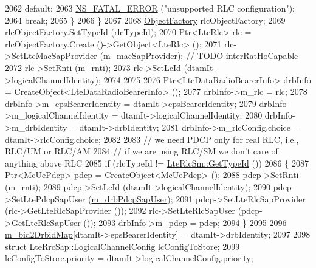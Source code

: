 \begin{DoxyCode}
2062                 \textcolor{keywordflow}{default}:
2063                   \hyperlink{group__fatal_ga5131d5e3f75d7d4cbfd706ac456fdc85}{NS\_FATAL\_ERROR} (\textcolor{stringliteral}{"unsupported RLC configuration"});
2064                   \textcolor{keywordflow}{break};                
2065                 \}
2066             \}
2067 
2068           \hyperlink{classns3_1_1Object_a2810e70b8c8377aa8617138fc0f65e92}{ObjectFactory} rlcObjectFactory;
2069           rlcObjectFactory.SetTypeId (rlcTypeId);
2070           Ptr<LteRlc> rlc = rlcObjectFactory.Create ()->GetObject<LteRlc> ();
2071           rlc->SetLteMacSapProvider (\hyperlink{classns3_1_1LteUeRrc_a194a22ce682adab02b0e9d2fc71fda48}{m\_macSapProvider}); \textcolor{comment}{// TODO interRatHoCapable }
2072           rlc->SetRnti (\hyperlink{classns3_1_1LteUeRrc_a8e078d8ef0ad23e670fe2ef08caab84f}{m\_rnti});
2073           rlc->SetLcId (dtamIt->logicalChannelIdentity);
2074 
2075 
2076           Ptr<LteDataRadioBearerInfo> drbInfo = CreateObject<LteDataRadioBearerInfo> ();
2077           drbInfo->m\_rlc = rlc;
2078           drbInfo->m\_epsBearerIdentity = dtamIt->epsBearerIdentity;
2079           drbInfo->m\_logicalChannelIdentity = dtamIt->logicalChannelIdentity;
2080           drbInfo->m\_drbIdentity = dtamIt->drbIdentity;
2081           drbInfo->m\_rlcConfig.choice = dtamIt->rlcConfig.choice;
2082  
2083           \textcolor{comment}{// we need PDCP only for real RLC, i.e., RLC/UM or RLC/AM}
2084           \textcolor{comment}{// if we are using RLC/SM we don't care of anything above RLC}
2085           \textcolor{keywordflow}{if} (rlcTypeId != \hyperlink{classns3_1_1LteRlcSm_a160bd39ce4e0d113dd5d93cc3a258045}{LteRlcSm::GetTypeId} ())
2086             \{
2087               Ptr<McUePdcp> pdcp = CreateObject<McUePdcp> (); 
2088               pdcp->SetRnti (\hyperlink{classns3_1_1LteUeRrc_a8e078d8ef0ad23e670fe2ef08caab84f}{m\_rnti});
2089               pdcp->SetLcId (dtamIt->logicalChannelIdentity);
2090               pdcp->SetLtePdcpSapUser (\hyperlink{classns3_1_1LteUeRrc_a6f2505a766e5a391d82170ebff83a9c2}{m\_drbPdcpSapUser});
2091               pdcp->SetLteRlcSapProvider (rlc->GetLteRlcSapProvider ());
2092               rlc->SetLteRlcSapUser (pdcp->GetLteRlcSapUser ());
2093               drbInfo->m\_pdcp = pdcp;
2094             \}
2095 
2096           \hyperlink{classns3_1_1LteUeRrc_a4b117cdc930ea78ed844b3fc44872d00}{m\_bid2DrbidMap}[dtamIt->epsBearerIdentity] = dtamIt->drbIdentity;
2097 
2098           \textcolor{keyword}{struct }LteRrcSap::LogicalChannelConfig lcConfigToStore;
2099           lcConfigToStore.priority = dtamIt->logicalChannelConfig.priority;

\end{DoxyCode}
